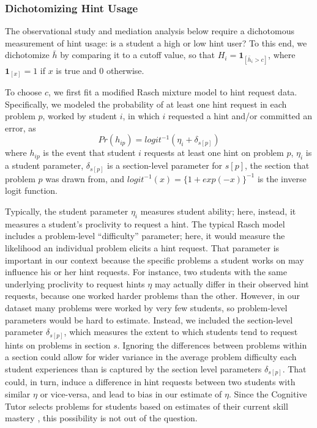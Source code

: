 \documentclass{article}\usepackage[]{graphicx}\usepackage[]{color}
\newcommand{\indicator}[1]{\mathbf{1}_{\left[ {#1} \right] }}
\begin{document}
\subsubsection{Dichotomizing Hint Usage}\label{sec:dichotomizingHintUsage}
The observational study and mediation analysis below require a dichotomous measurement of hint usage: is a
student a high or low hint user?
To this end, we dichotomize $\bar{h}$ by comparing it to a cutoff value, so
that $H_i=\indicator{\bar{h}_i>c}$, where $\indicator{x}=1$ if $x$ is true
and 0 otherwise.

To choose $c$, we first fit a modified Rasch mixture model
\citep{rasch} to hint request data.
Specifically, we modeled the probability of at least one hint request in each problem
$p$, worked by student $i$, in which $i$ requested a hint and/or
committed an error, as
\begin{equation}\label{eq:rasch}
Pr(h_{ip})=logit^{-1}(\eta_i+\delta_{s[p]})
\end{equation}
where $h_{ip}$ is the event that student $i$ requests at least one hint on
problem $p$, $\eta_i$ is a student parameter, $\delta_{s[p]}$ is a
section-level parameter for $s[p]$, the section that problem $p$ was
drawn from, and $logit^{-1}(x)=\{1+exp(-x)\}^{-1}$ is the inverse logit
function.

Typically, the student parameter $\eta_i$ measures student ability;
here, instead, it measures a student's proclivity to request a hint.
The typical Rasch model includes a problem-level ``difficulty''
parameter; here, it would measure the likelihood an individual problem
elicits a hint request.
That parameter is important in our context because the
specific problems a student works on may influence his or her hint
requests.
For instance, two students with the same underlying proclivity to request
hints $\eta$ may actually differ in their observed hint requests, because one
worked harder problems than the other.
However, in our dataset many problems were worked by very few students, so problem-level parameters would be hard to estimate.
Instead, we included the section-level parameter $\delta_{s[p]}$,
which measures the extent to which students tend to request hints on
problems in section $s$.
Ignoring the differences between problems within a section could allow for wider
variance in the average problem difficulty each student experiences
than is captured by the section level parameters $\delta_{s[p]}$.
That could, in turn, induce a difference in hint requests between two
students with similar $\eta$ or vice-versa, and lead
to bias in our estimate of $\eta$.
Since the Cognitive Tutor selects problems for students based on estimates
of their current skill mastery \citep{steveFaied2020}, this
possibility is not out of the question.
\end{document}
